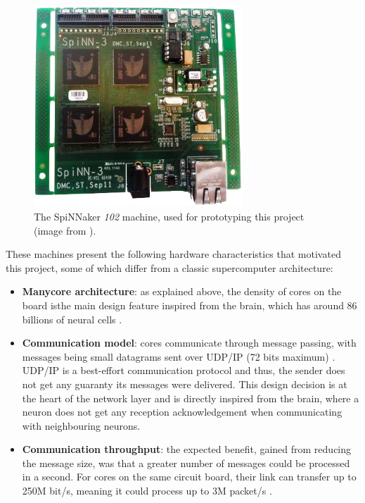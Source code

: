 \begin{figure}[!ht]
   \centering
       \includegraphics[width=0.7\textwidth]{figures/spin3.png}
       \caption{The SpiNNaker \textit{102} machine, used for prototyping this project (image from \cite{spinn-3}).}
       \label{fig:spinn3}
\end{figure}

These machines present the following hardware characteristics that motivated this project, some of which differ from a classic supercomputer architecture:

\begin{itemize}
\item \textbf{Manycore architecture}: as explained above, the density of cores on the board isthe main design feature inspired from the brain, which has around 86 billions of neural cells \cite{5th-summit}.

\item \textbf{Communication model}: cores communicate through message passing, with messages being small datagrams sent over UDP/IP (72 bits maximum) \cite{ws6}. UDP/IP is a best-effort communication protocol and thus, the sender does not get any guaranty its messages were delivered. This design decision is at the heart of the network layer and is directly inspired from the brain, where a neuron does not get any reception acknowledgement when communicating with neighbouring neurons.

\item \textbf{Communication throughput}: the expected benefit, gained from reducing the message size, was that a greater number of messages could be processed in a second. For cores on the same circuit board, their link can transfer up to 250M bit/s, meaning it could process up to 3M packet/s \cite{ws6}.
\end{itemize}

